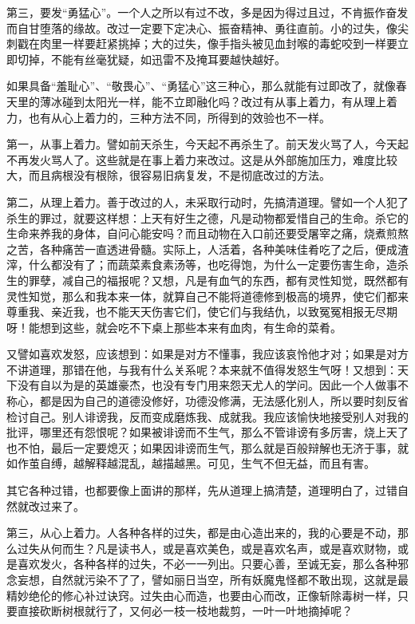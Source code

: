 \documentclass[12pt,UTF8]{ctexbook}
\begin{document}
第三，要发“勇猛心”。一个人之所以有过不改，多是因为得过且过，不肯振作奋发而自甘堕落的缘故。改过一定要下定决心、振奋精神、勇往直前。小的过失，像尖刺戳在肉里一样要赶紧挑掉；大的过失，像手指头被见血封喉的毒蛇咬到一样要立即切掉，不能有丝毫犹疑，如迅雷不及掩耳要越快越好。

如果具备“羞耻心”、“敬畏心”、“勇猛心”这三种心，那么就能有过即改了，就像春天里的薄冰碰到太阳光一样，能不立即融化吗？改过有从事上着力，有从理上着力，也有从心上着力的，三种方法不同，所得到的效验也不一样。

第一，从事上着力。譬如前天杀生，今天起不再杀生了。前天发火骂了人，今天起不再发火骂人了。这些就是在事上着力来改过。这是从外部施加压力，难度比较大，而且病根没有根除，很容易旧病复发，不是彻底改过的方法。

第二，从理上着力。善于改过的人，未采取行动时，先搞清道理。譬如一个人犯了杀生的罪过，就要这样想：上天有好生之德，凡是动物都爱惜自己的生命。杀它的生命来养我的身体，自问心能安吗？而且动物在入口前还要受屠宰之痛，烧煮煎熬之苦，各种痛苦一直透进骨髓。实际上，人活着，各种美味佳肴吃了之后，便成渣滓，什么都没有了；而蔬菜素食素汤等，也吃得饱，为什么一定要伤害生命，造杀生的罪孽，减自己的福报呢？又想，凡是有血气的东西，都有灵性知觉，既然都有灵性知觉，那么和我本来一体，就算自己不能将道德修到极高的境界，使它们都来尊重我、亲近我，也不能天天伤害它们，使它们与我结仇，以致冤冤相报无尽期呀！能想到这些，就会吃不下桌上那些本来有血肉，有生命的菜肴。

又譬如喜欢发怒，应该想到：如果是对方不懂事，我应该哀怜他才对；如果是对方不讲道理，那错在他，与我有什么关系呢？本来就不值得发怒生气呀！又想到：天下没有自以为是的英雄豪杰，也没有专门用来怨天尤人的学问。因此一个人做事不称心，都是因为自己的道德没修好，功德没修满，无法感化别人，所以要时刻反省检讨自己。别人诽谤我，反而变成磨炼我、成就我。我应该愉快地接受别人对我的批评，哪里还有怨恨呢？如果被诽谤而不生气，那么不管诽谤有多厉害，烧上天了也不怕，最后一定要熄灭；如果因诽谤而生气，那么就是百般辩解也无济于事，就如作茧自缚，越解释越混乱，越描越黑。可见，生气不但无益，而且有害。

其它各种过错，也都要像上面讲的那样，先从道理上搞清楚，道理明白了，过错自然就改过来了。

第三，从心上着力。人各种各样的过失，都是由心造出来的，我的心要是不动，那么过失从何而生？凡是读书人，或是喜欢美色，或是喜欢名声，或是喜欢财物，或是喜欢发火，各种各样的过失，不必一一列出。只要心善，至诚无妄，那么各种邪念妄想，自然就污染不了了，譬如丽日当空，所有妖魔鬼怪都不敢出现，这就是最精妙绝伦的修心补过诀窍。过失由心而造，也要由心而改，正像斩除毒树一样，只要直接砍断树根就行了，又何必一枝一枝地裁剪，一叶一叶地摘掉呢？
\end{document}
